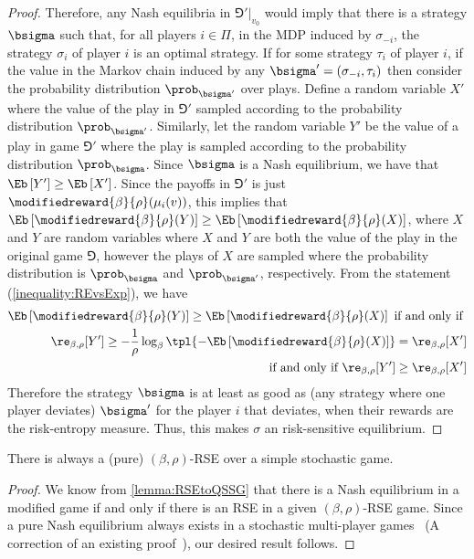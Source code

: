 \begin{proof}
    Therefore, any Nash equilibria in  $\Game'|_{v_0}$ would imply that there is a strategy $\bsigma$ such that, for all players $i\in\Pi$, in the MDP induced by $\sigma_{-i}$,  the strategy  $\sigma_i$ of player $i$ is an optimal strategy. If for some strategy $\tau_i$ of player $i$, if the value in the Markov chain induced by any $\bsigma' = (\sigma_{-i}, \tau_i)$ then consider the probability distribution $\prob_{\bsigma'}$ over plays. Define a random variable $X'$ where the value of the play in $\Game'$ sampled according to the probability distribution $\prob_{\bsigma'}$. 
    Similarly, let the random variable $Y'$ be the value of a play in game $\Game'$ where the play is sampled according to the probability distribution $\prob_{\bsigma}$. Since $\bsigma$ is a Nash equilibrium, we have that  
     $\Eb\left[Y'\right]\geq \Eb\left[X'\right]$.
     Since the payoffs in $\Game'$ is just $\modifiedreward{\beta}{\rho}(\mu_i(v))$, this implies that $\Eb\left[\modifiedreward{\beta}{\rho}(Y)\right]\geq \Eb\left[\modifiedreward{\beta}{\rho}(X)\right]$, where 
     $X$ and $Y$ are random variables where $X$ and $Y$ are both the value of the play in the original game $\Game$, however the plays of $X$ are sampled where the probability distribution is $\prob_{\bsigma}$ and $\prob_{\bsigma'}$, respectively. 
     From the statement (\ref{inequality:REvsExp}), we have     
     \begin{align*}
         \Eb\left[\modifiedreward{\beta}{\rho}(Y)\right]\geq \Eb\left[\modifiedreward{\beta}{\rho}(X)\right]\text{ if and only if }\\\re_{\beta,\rho}[Y'] \geq -\frac{1}{\rho}\log_\beta\tpl{-\Eb\left[\modifiedreward{\beta}{\rho}(X)\right] } = \re_{\beta,\rho}[X']\\
         \text{ if and only if }\re_{\beta,\rho}[Y']\geq \re_{\beta,\rho}[X']
     \end{align*}
      Therefore the strategy  $\bsigma$ is at least as good as (any strategy where one player deviates) $\bsigma'$ for the player $i$ that deviates, when their rewards are the risk-entropy measure. Thus, this makes $\sigma$ an risk-sensitive equilibrium. %
\end{proof}
\begin{theorem}\label{thm:existanceRSE}
    There is always a (pure) $(\beta,\rho)$-RSE over a simple stochastic game. 
\end{theorem}
\begin{proof}
We know from \cref{lemma:RSEtoQSSG} that there is a Nash equilibrium in a modified game if and only if there is an RSE in a given $(\beta,\rho)$-RSE game. Since a pure Nash equilibrium always exists in a stochastic multi-player games~\cite[Theorem 3.10]{Umm10} (A correction of an existing proof~\cite{CMJ04}), our desired result follows.  
\end{proof}
